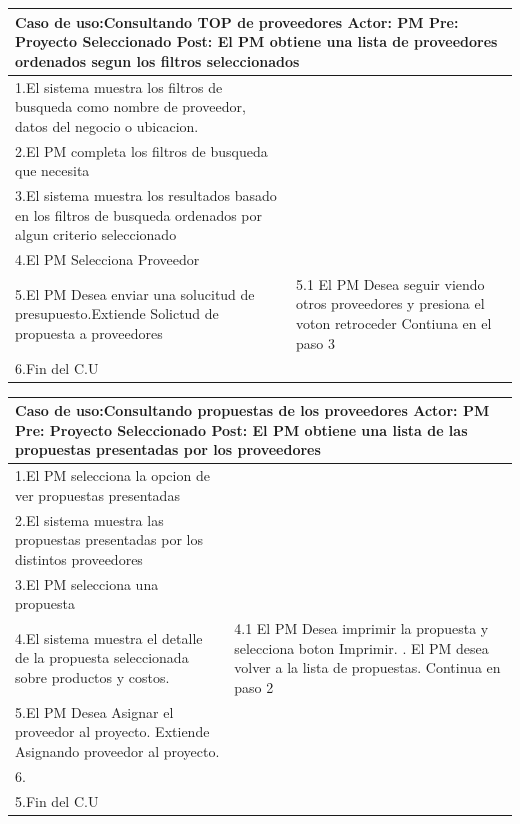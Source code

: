 \begin{longtable}{|p{}|p{}|}
    \hline
    \multicolumn{2}{|p{16cm}|}{
        \textbf{Caso de uso:}Consultando TOP de proveedores\newline
        \textbf{Actor:} PM\newline
        \textbf{Pre: }Proyecto Seleccionado\newline
        \textbf{Post:} El PM obtiene una lista de proveedores ordenados segun los filtros seleccionados
    }\\
    \hline
    1.El sistema muestra los filtros de busqueda como nombre de proveedor, datos del negocio o ubicacion. & \\
    \hline
    2.El PM completa los filtros de busqueda que necesita&  \\
    \hline
    3.El sistema muestra los resultados basado en los filtros de busqueda ordenados por algun criterio seleccionado& \\
    \hline
    4.El PM Selecciona Proveedor &\\
    \hline
    5.El PM Desea enviar una solucitud de presupuesto.Extiende Solictud de propuesta a proveedores &5.1 El PM Desea seguir viendo otros proveedores y presiona el voton retroceder \newline 5.2 Contiuna en el paso 3\\
    \hline
    6.Fin del C.U&\\
    \hline
\end{longtable}


\begin{longtable}{|p{}|p{}|}
    \hline
    \multicolumn{2}{|p{16cm}|}{
        \textbf{Caso de uso:}Consultando propuestas de los proveedores\newline
        \textbf{Actor:} PM\newline
        \textbf{Pre: }Proyecto Seleccionado\newline
        \textbf{Post:} El PM obtiene una lista de las propuestas presentadas por los proveedores
    }\\
    \hline
    1.El PM selecciona la opcion de ver propuestas presentadas&\\
    \hline
    2.El sistema muestra las propuestas presentadas por los distintos proveedores & \\
    \hline
    3.El PM selecciona una propuesta  &\\
    \hline
    4.El sistema muestra el detalle de la propuesta seleccionada sobre productos y costos.&4.1 El PM Desea imprimir la propuesta y selecciona boton Imprimir. \newline 4.2. El PM desea volver a la lista de propuestas. Continua en paso 2\\
    \hline
    5.El PM Desea Asignar el proveedor al proyecto. Extiende Asignando proveedor al proyecto.&\\
    \hline
    6.&\\
    \hline
    5.Fin del C.U&\\
    \hline
\end{longtable}

